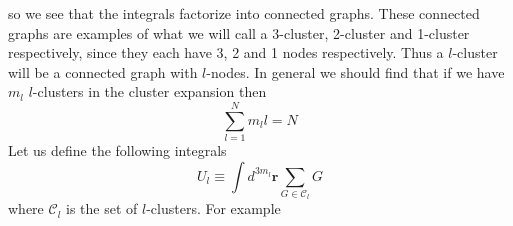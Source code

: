 \documentclass[a4paper,11pt,oneside]{book}
\begin{document}
so we see that the integrals factorize into connected graphs. These connected graphs  are examples of what we will call a 3-cluster, 2-cluster and 1-cluster respectively, since they each have 3, 2 and 1 nodes respectively. Thus a $l$-cluster will be a connected graph with $l$-nodes. In general we should find that if we have $m_l$ $l$-clusters in the cluster expansion then
\begin{equation}\label{cond1}
    \sum_{l=1}^N m_l l = N
\end{equation}
Let us define the following integrals
\begin{equation}
    U_l \equiv \int d^{3m_l}\textbf{r} \sum_{G\in \mathcal{C}_l} G
\end{equation}
where $\mathcal{C}_l$ is the set of $l$-clusters. For example
\end{document}
